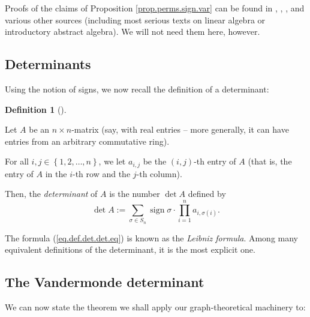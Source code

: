 \documentclass[numbers=enddot,12pt,final,onecolumn,notitlepage]{scrartcl}%
\numberwithin{exer}{subsection}
\theoremstyle{definition}
\newtheorem{defi}[theo]{Definition}
\newenvironment{definition}[1][]
{\begin{defi}[#1]\begin{leftbar}}
{\end{leftbar}\end{defi}}
\let\sumnonlimits\sum
\let\prodnonlimits\prod
\renewcommand{\sum}{\sumnonlimits\limits}
\renewcommand{\prod}{\prodnonlimits\limits}
\begin{document}
Proofs of the claims of Proposition \ref{prop.perms.sign.var} can be found in
\cite[\S 5.1--\S 5.3]{detnotes}, \cite{Conrad}, \cite[Chapter 6.B]{Day16},
\cite[Appendix B]{Strick20} and various other sources (including most serious
texts on linear algebra or introductory abstract algebra). We will not need
them here, however.

\subsection{Determinants}

Using the notion of signs, we now recall the definition of a determinant:

\begin{definition}
\label{def.det.det}Let $A$ be an $n\times n$-matrix (say, with real entries --
more generally, it can have entries from an arbitrary commutative ring).

For all $i,j\in\left\{  1,2,\ldots,n\right\}  $, we let $a_{i,j}$ be the
$\left(  i,j\right)  $-th entry of $A$ (that is, the entry of $A$ in the
$i$-th row and the $j$-th column).

Then, the \emph{determinant} of $A$ is the number $\det A$ defined by%
\begin{equation}
\det A:=\sum_{\sigma\in S_{n}}\operatorname*{sign}\sigma\cdot\prod_{i=1}%
^{n}a_{i,\sigma\left(  i\right)  }. \label{eq.def.det.det.eq}%
\end{equation}

\end{definition}

The formula (\ref{eq.def.det.det.eq}) is known as the \emph{Leibniz formula}.
Among many equivalent definitions of the determinant, it is the most explicit one.

\subsection{The Vandermonde determinant}

We can now state the theorem we shall apply our graph-theoretical machinery to:
\end{document}
